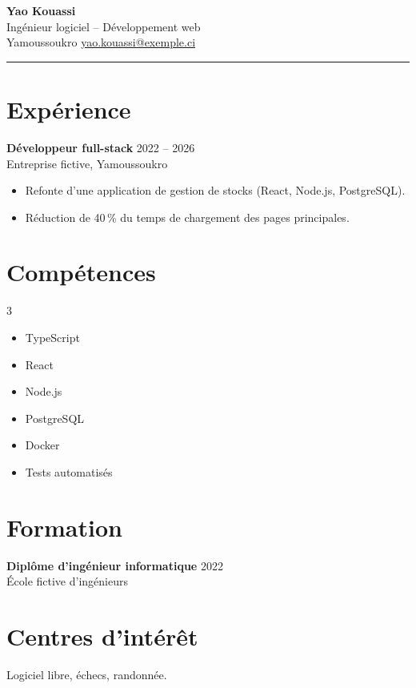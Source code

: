 \documentclass[10pt,a4paper]{article}
\begin{document}
\begin{minipage}{0.7\textwidth}
{\Large\textbf{Yao Kouassi}}\\
Ingénieur logiciel -- Développement web\\
Yamoussoukro \quad \href{mailto:yao.kouassi@exemple.ci}{yao.kouassi@exemple.ci}
\end{minipage}
\hfill
\begin{minipage}{0.25\textwidth}
\raggedleft
\end{minipage}

\bigskip\hrule\bigskip

\section*{Expérience}
\textbf{Développeur full-stack} \hfill 2022 -- 2026\\
Entreprise fictive, Yamoussoukro
\begin{itemize}[leftmargin=*]
  \item Refonte d'une application de gestion de stocks (React, Node.js, PostgreSQL).
  \item Réduction de 40\,\% du temps de chargement des pages principales.
\end{itemize}

\section*{Compétences}
\begin{multicols}{3}
\begin{itemize}[leftmargin=*]
  \item TypeScript
  \item React
  \item Node.js
  \item PostgreSQL
  \item Docker
  \item Tests automatisés
\end{itemize}
\end{multicols}

\section*{Formation}
\textbf{Diplôme d'ingénieur informatique} \hfill 2022\\
École fictive d'ingénieurs

\section*{Centres d'intérêt}
Logiciel libre, échecs, randonnée.
\end{document}
